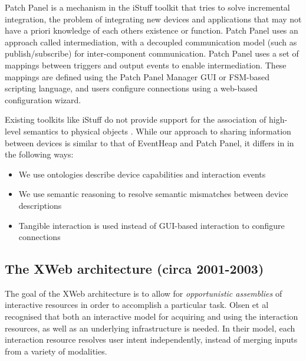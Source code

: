 
Patch Panel \cite{Ballagas2004} is a mechanism in the iStuff toolkit that tries to solve incremental integration, the problem of integrating new devices and applications that may not have a priori knowledge of each others existence or function. Patch Panel uses an approach called intermediation, with a decoupled communication model (such as publish/subscribe) for inter-component communication.  Patch Panel uses a set of mappings between triggers and output events to enable intermediation. These mappings are defined using the Patch Panel Manager \ac{GUI} or \ac{FSM}-based scripting language, and users configure connections using a web-based configuration wizard.



Existing toolkits like iStuff do not provide support for the association of high-level semantics to physical objects \cite{Shaer2004}. While our approach to sharing information between devices is similar to that of EventHeap and Patch Panel, it differs in in the following ways:

\begin{itemize}
    \item We use ontologies describe device capabilities and interaction events
    \item We use semantic reasoning to resolve semantic mismatches between device descriptions
    \item Tangible interaction is used instead of \ac{GUI}-based interaction to configure connections
\end{itemize}


\subsection{The XWeb architecture (circa 2001-2003)}
The goal of the XWeb architecture is to allow for \emph{opportunistic assemblies} of interactive resources in order to accomplish a particular task. Olsen et al \cite{Olsen2001} recognised that both an interactive model for acquiring and using the interaction resources, as well as an underlying infrastructure is needed. In their model, each interaction resource resolves user intent independently, instead of merging inputs from a variety of modalities.

